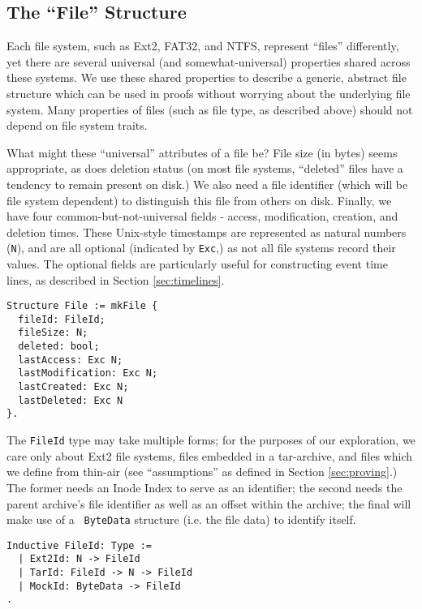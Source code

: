 \documentclass[nocopyrightspace,preprint]{sigplanconf}
\begin{document}
\subsection{The ``File'' Structure}

Each file system, such as Ext2, FAT32, and NTFS, represent ``files''
differently, yet there are several universal (and somewhat-universal)
properties shared across these systems. We use these shared properties to
describe a generic, abstract file structure which can be used in proofs
without worrying about the underlying file system. Many properties of files
(such as file type, as described above) should not depend on file system
traits.

What might these ``universal'' attributes of a file be? File size (in bytes)
seems appropriate, as does deletion status (on most file systems, ``deleted''
files have a tendency to remain present on disk.) We also need a file
identifier (which will be file system dependent) to distinguish this file from
others on disk. Finally, we have four common-but-not-universal fields -
access, modification, creation, and deletion times. These Unix-style
timestamps are represented as natural numbers ({\tt N}), and are all optional
(indicated by {\tt Exc},) as not all file systems record their values. The
optional fields are particularly useful for constructing event time lines, as
described in Section \ref{sec:timelines}.

\begin{lstlisting}
Structure File := mkFile {
  fileId: FileId;
  fileSize: N;
  deleted: bool;
  lastAccess: Exc N;
  lastModification: Exc N;
  lastCreated: Exc N;
  lastDeleted: Exc N
}.
\end{lstlisting}

The {\tt FileId} type may take multiple forms; for the purposes of our
exploration, we care only about Ext2 file systems, files embedded in a
tar-archive, and files which we define from thin-air (see ``assumptions'' as
defined in Section \ref{sec:proving}.) The former needs an Inode Index to
serve as an identifier; the second needs the parent archive's file identifier
as well as an offset within the archive; the final will make use of a {\tt
ByteData} structure (i.e. the file data) to identify itself.

\begin{lstlisting}
Inductive FileId: Type :=
  | Ext2Id: N -> FileId
  | TarId: FileId -> N -> FileId
  | MockId: ByteData -> FileId
.
\end{lstlisting}
\end{document}
